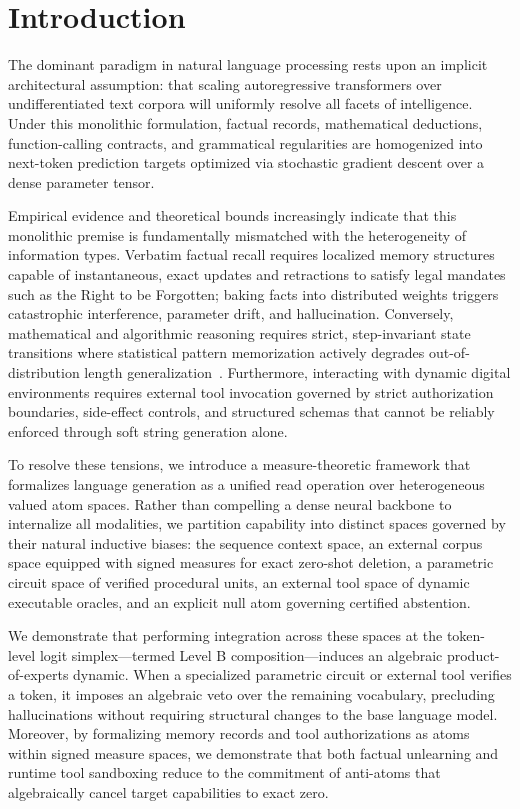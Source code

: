 \documentclass[preprint,12pt]{elsarticle}
\begin{document}
\section{Introduction}

The dominant paradigm in natural language processing rests upon an implicit architectural assumption: that scaling autoregressive transformers over undifferentiated text corpora will uniformly resolve all facets of intelligence. Under this monolithic formulation, factual records, mathematical deductions, function-calling contracts, and grammatical regularities are homogenized into next-token prediction targets optimized via stochastic gradient descent over a dense parameter tensor.

Empirical evidence and theoretical bounds increasingly indicate that this monolithic premise is fundamentally mismatched with the heterogeneity of information types. Verbatim factual recall requires localized memory structures capable of instantaneous, exact updates and retractions to satisfy legal mandates such as the Right to be Forgotten; baking facts into distributed weights triggers catastrophic interference, parameter drift, and hallucination. Conversely, mathematical and algorithmic reasoning requires strict, step-invariant state transitions where statistical pattern memorization actively degrades out-of-distribution length generalization~\cite{merrill2024expressive}. Furthermore, interacting with dynamic digital environments requires external tool invocation governed by strict authorization boundaries, side-effect controls, and structured schemas that cannot be reliably enforced through soft string generation alone.

To resolve these tensions, we introduce a measure-theoretic framework that formalizes language generation as a unified read operation over heterogeneous valued atom spaces. Rather than compelling a dense neural backbone to internalize all modalities, we partition capability into distinct spaces governed by their natural inductive biases:
the sequence context space,
an external corpus space equipped with signed measures for exact zero-shot deletion,
a parametric circuit space of verified procedural units,
an external tool space of dynamic executable oracles,
and an explicit null atom governing certified abstention.

We demonstrate that performing integration across these spaces at the token-level logit simplex—termed Level B composition—induces an algebraic product-of-experts dynamic. When a specialized parametric circuit or external tool verifies a token, it imposes an algebraic veto over the remaining vocabulary, precluding hallucinations without requiring structural changes to the base language model. Moreover, by formalizing memory records and tool authorizations as atoms within signed measure spaces, we demonstrate that both factual unlearning and runtime tool sandboxing reduce to the commitment of anti-atoms that algebraically cancel target capabilities to exact zero.
\end{document}
